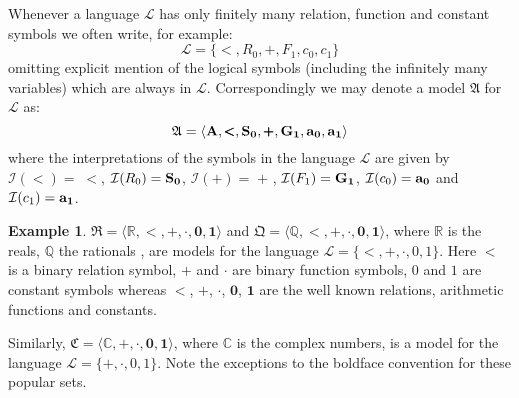 \documentclass[titlepage, oneside]{amsbook}
\theoremstyle{plain}
\theoremstyle{definition}
\newtheorem{examples}{Example}
\theoremstyle{remark}
\newcommand{\lan}{\ensuremath{\mathcal{L}}}
\newcommand{\ma}{\ensuremath{\mathfrak{A}}}
\newcommand{\ba}{\ensuremath{\mathbf{A}}}
\begin{document}
Whenever a language $\lan$ has only finitely many relation, function and
constant symbols we often write, for example: \[ \lan = \{ < , R_0 , + ,
F_1 , c_0 , c_1 \} \] omitting explicit mention of the logical symbols
(including the infinitely many variables) which are always in $\lan$.
Correspondingly we may denote a model $\ma$ for $\lan$ as: \[ \ma =
\langle \ba , \pmb{<}, \bf{S}_{0} , \pmb{+}, \bf{G}_{1} ,
\bf{a}_{0} ,\bf{a}_{1} \rangle \]
where the interpretations of the symbols in the language $\lan$ are
given by 
 $\mathcal I (<) = \; \pmb{<}$, $\mathcal I (R_0) = \bf{S_0}$,
  $\mathcal
I (+) = \; \pmb{+}$ , $ \mathcal I (F_1) = \bf{G}_{1}$, $ \mathcal{I}
(c_0)
= \bf{a}_{0} $ and $ \mathcal I (c_1) = \bf{a_1} $.



\begin{examples}\label{X:real}
%
%
%
%
%
%
 $\mathfrak R = \langle \mathbb R , \pmb{<} , \pmb{+} , \mathbf{\cdot}
,\mathbf{0}, \mathbf{1} \rangle $ and
 $\mathfrak Q = \langle \mathbb Q ,\pmb{<} ,\pmb{ +} ,
\mathbf{\cdot},\mathbf{0}, \mathbf{ 1} \rangle $,  where $\mathbb R$
is the reals,
$\mathbb Q$ the
rationals ,
are models for the language $\lan = \{ <, + , \cdot , 0,1 \}$. Here 
${<}$ is a binary relation symbol, ${ +}$  and ${\cdot}$
are binary function symbols, ${0}$ and 
${ 1}$ are constant symbols whereas $\pmb{<}$, $\pmb{+} $,
$\mathbf{\cdot}$, $\mathbf{0}$, $\mathbf{1}$  are the well
known
relations, arithmetic functions and
constants.

Similarly, $\mathfrak C = \langle \mathbb C , \pmb{+} ,\mathbf{\cdot} ,
\mathbf{0} ,
\mathbf{1} \rangle $, where
$\mathbb C$ is the complex numbers, is a model for the language $\lan =
\{ +, \cdot, 0 , 1 \} $.  Note the exceptions to the boldface
convention for these popular sets.

 \end{examples}
\end{document}

